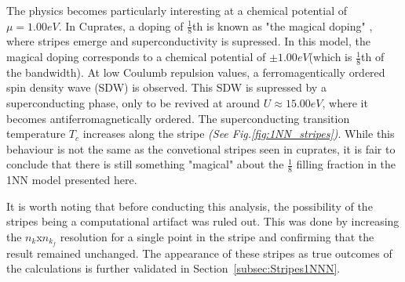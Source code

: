\documentclass[12pt]{article}
\begin{document}
\noindent The physics becomes particularly interesting at a chemical potential of $\mu =1.00eV$. 
In  Cuprates, a doping of $\frac{1}{8}$th is known as "the magical doping" \cite{komiya2005magic}, where
stripes emerge and superconductivity is supressed. In this model, the magical doping corresponds 
to a chemical potential of $\pm 1.00eV$(which is $\frac{1}{8}$th of the bandwidth). 
At low Coulumb repulsion values, a ferromagentically ordered spin density wave (SDW) is observed. This SDW is supressed by a superconducting phase,
only to be revived at around $U \approx 15.00eV$, where it becomes antiferromagnetically ordered. The superconducting transition temperature $T_c$ increases along the stripe \textit{(See Fig.\ref{fig:1NN_stripes})}.
While this behaviour is not the same as the convetional stripes seen in cuprates, it is fair to conclude that there is still something 
"magical" about the $\frac{1}{8}$ filling fraction in the 1NN model presented here. \par
\medskip

\noindent It is  worth noting that before conducting this analysis, the possibility of the stripes being a computational artifact was ruled out.
This was done by increasing the $n_k$x$n_{k_f}$ resolution for a single point in the stripe and
confirming that the result remained unchanged. The appearance of these stripes as true outcomes of the calculations is further validated in Section~\ref{subsec:Stripes1NNN}.
\end{document}
